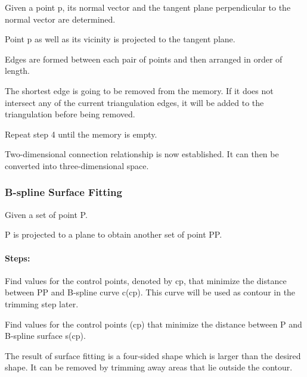 \begin{DoxyEnumerate}
\item Given a point p, its normal vector and the tangent plane perpendicular to the normal vector are determined.
\item Point p as well as its vicinity is projected to the tangent plane.
\item Edges are formed between each pair of points and then arranged in order of length.
\item The shortest edge is going to be removed from the memory. If it does not intersect any of the current triangulation edges, it will be added to the triangulation before being removed.
\item Repeat step 4 until the memory is empty.
\item Two-\/dimensional connection relationship is now established. It can then be converted into three-\/dimensional space. 


\end{DoxyEnumerate}

\subsubsection*{B-\/spline Surface Fitting}


\begin{DoxyItemize}
\item Given a set of point P.
\item P is projected to a plane to obtain another set of point PP.
\end{DoxyItemize}

\paragraph*{Steps\+:}


\begin{DoxyEnumerate}
\item Find values for the control points, denoted by cp, that minimize the distance between PP and B-\/spline curve c(cp). This curve will be used as contour in the trimming step later.
\item Find values for the control points (cp) that minimize the distance between P and B-\/spline surface s(cp).
\item The result of surface fitting is a four-\/sided shape which is larger than the desired shape. It can be removed by trimming away areas that lie outside the contour. 


\end{DoxyEnumerate}


